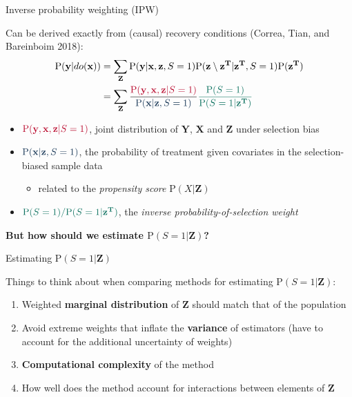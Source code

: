 \documentclass[
  ignorenonframetext,
]{beamer}
\providecommand{\tightlist}{%
  \setlength{\itemsep}{0pt}\setlength{\parskip}{0pt}}
\begin{document}
\begin{frame}{Inverse probability weighting (IPW)}
\protect\hypertarget{inverse-probability-weighting-ipw}{}

Can be derived exactly from (causal) recovery conditions (Correa, Tian,
and Bareinboim 2018): \begin{align}
\text{P}(\mathbf{y}|do(\mathbf{x})) &= \sum_\mathbf{Z} \text{P}(\mathbf{y}|\mathbf{x}, \mathbf{z}, S=1)\text{P}(\mathbf{z}\setminus\mathbf{z^T}|\mathbf{z^T}, S = 1)\text{P}(\mathbf{z^T})\\
&= \sum_\mathbf{Z} \frac{\textcolor{oxfordred}{\text{P}(\mathbf{y}, \mathbf{x}, \mathbf{z} | S = 1)}}{\textcolor{oxfordlightblue}{\text{P}(\mathbf{x}| \mathbf{z}, S = 1)}} \textcolor{oxfordgreen}{\frac{\text{P}(S = 1)}{\text{P}(S = 1 | \mathbf{z^T})}} \label{eq:IPSW}
\end{align}

\begin{itemize}
\tightlist
\item
  \(\textcolor{oxfordred}{\text{P}(\mathbf{y}, \mathbf{x}, \mathbf{z} | S = 1)}\),
  joint distribution of \(\mathbf{Y}\), \(\mathbf{X}\) and
  \(\mathbf{Z}\) under selection bias
\item
  \(\textcolor{oxfordlightblue}{\text{P}(\mathbf{x}| \mathbf{z}, S = 1)}\),
  the probability of treatment given covariates in the selection-biased
  sample data

  \begin{itemize}
  \tightlist
  \item
    related to the \emph{propensity score} \(\text{P}(X|\mathbf{Z})\)
  \end{itemize}
\item
  \(\textcolor{oxfordgreen}{\text{P}(S = 1)/\text{P}(S = 1 | \mathbf{z^T})}\),
  the \textit{inverse probability-of-selection weight}
\end{itemize}

\textbf{But how should we estimate \(\text{P}(S = 1 | \mathbf{Z})\)?}

\end{frame}

\begin{frame}{Estimating \(\text{P}(S = 1 | \mathbf{Z})\)}
\protect\hypertarget{estimating-textps-1-mathbfz}{}

Things to think about when comparing methods for estimating
\(\text{P}(S = 1 | \mathbf{Z})\):

\begin{enumerate}
\item
  Weighted \textbf{marginal distribution} of \(\mathbf{Z}\) should match
  that of the population
\item
  Avoid extreme weights that inflate the \textbf{variance} of estimators
  (have to account for the additional uncertainty of weights)
\item
  \textbf{Computational complexity} of the method
\item
  How well does the method account for interactions between elements of
  \(\mathbf{Z}\)
\end{enumerate}

\end{frame}
\end{document}
